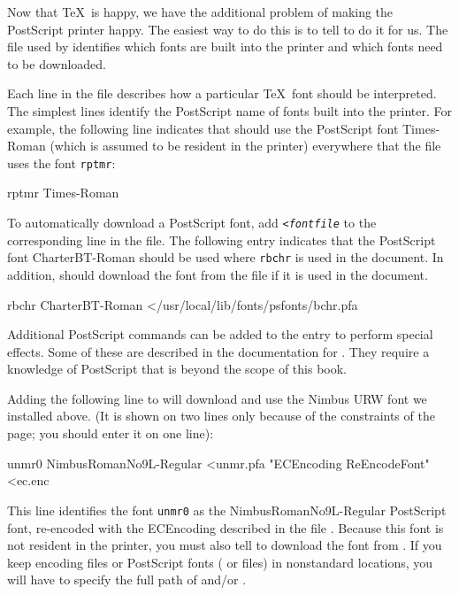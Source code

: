 Now that \TeX\ is happy, we have the additional problem of making the
PostScript printer happy.  The easiest way to do this is to tell
 to do it for us.  The  file used
by  identifies which fonts are built into the printer and
which fonts need to be downloaded. 

Each line in the  file describes how a particular
\TeX\ font should be interpreted.  The simplest lines identify the PostScript
name of fonts built into the printer.   For
\linebreak
\newpage
example, the following line
indicates that  should use the PostScript font Times-Roman
(which is assumed to be resident in the printer) everywhere that the 
 file uses the font \texttt{rptmr}:

\begin{shortexample}
rptmr Times-Roman
\end{shortexample}

To automatically download a 
PostScript font, 
add \verb|<|\texttt{\textit{fontfile}}
to the corresponding line in the  file.  The following
entry indicates that the PostScript font CharterBT-Roman should be used
where \texttt{rbchr} is used in the document.  In addition, 
should download the font from the file
 if it is used in the
document.

\begin{shortexample}
rbchr CharterBT-Roman </usr/local/lib/fonts/psfonts/bchr.pfa
\end{shortexample}

Additional PostScript commands can be added to the entry to perform special
effects.  Some of these are described in the documentation for
. They require a knowledge of PostScript that is beyond the 
scope of this book.

Adding the following line to  will download and use the
Nimbus URW font we installed above. (It is shown on two lines only because of
the constraints of the page; you should enter it on one line):

\begin{shortexample}
unmr0 NimbusRomanNo9L-Regular <unmr.pfa
      "ECEncoding ReEncodeFont" <ec.enc
\end{shortexample}

This line identifies the font \texttt{unmr0} as the NimbusRomanNo9L-Regular
PostScript font,  re-encoded with the ECEncoding
described in the file .  Because this font is not resident
in the printer, you must also tell  to download the font
from .  If you keep encoding files or PostScript fonts
( or  files) in nonstandard locations, you will have
to specify the full path of  and/or .

